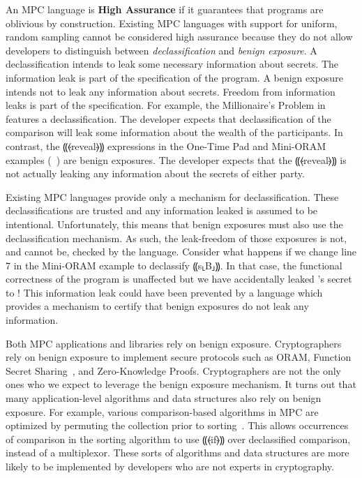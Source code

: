 An MPC language is \textbf{High Assurance} if it guarantees that programs are oblivious by construction.
Existing MPC languages with support for uniform, random sampling cannot be considered high assurance because
they do not allow developers to distinguish between \emph{declassification} and \emph{benign exposure}.
A declassification intends to leak some necessary information about secrets. The information leak is part of
the specification of the program. A benign exposure intends not to leak any information about secrets. Freedom
from information leaks is part of the specification. For example, the Millionaire's Problem in~
features a declassification. The developer expects that declassification of the comparison will leak some information about the wealth of the
participants. In contrast, the ⸨⦑reveal⦒⸩ expressions in the One-Time Pad and Mini-ORAM examples (~)
are benign exposures. The developer expects that the ⸨⦑reveal⦒⸩ is not actually leaking any information about the secrets
of either party.

Existing MPC languages provide only a mechanism for declassification. These declassifications are trusted and any
information leaked is assumed to be intentional. Unfortunately, this means that benign exposures must also use the
declassification mechanism. As such, the leak-freedom of those exposures is not, and cannot be, checked by the language.
Consider what happens if we change line 7 in the Mini-ORAM example to declassify ⸨s⸤B⸥⸩.
In that case, the functional correctness of the program is unaffected but we have accidentally leaked \bob's secret to \alice!
This information leak could have been prevented by a language which provides a mechanism to certify that benign exposures do
not leak any information.

Both MPC applications and libraries rely on benign exposure. Cryptographers rely on benign exposure to implement secure protocols such as ORAM,
Function Secret Sharing~\cite{}, and Zero-Knowledge Proofs\cite{}. Cryptographers are not the only ones who we expect to leverage the
benign exposure mechanism. It turns out that many application-level algorithms and data structures also rely on benign exposure. For example,
various comparison-based algorithms in MPC are optimized by permuting the collection prior to sorting~\cite{hamada2012}. This allows occurrences of
comparison in the sorting algorithm to use ⸨⦑if⦒⸩ over declassified comparison, instead of a multiplexor. These sorts of algorithms and
data structures are more likely to be implemented by developers who are not experts in cryptography.

